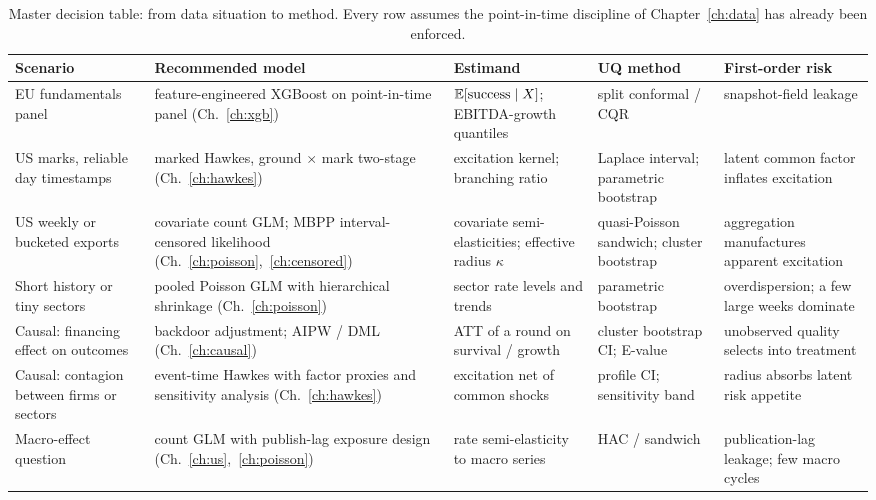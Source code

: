\begin{table}[htbp]
\centering
\footnotesize
\begin{tabular}{p{2.5cm}p{3.4cm}p{2.9cm}p{2.6cm}p{3.0cm}}
\toprule
Scenario & Recommended model & Estimand & UQ method & First-order risk \\
\midrule
EU fundamentals panel & feature-engineered XGBoost on point-in-time panel (Ch.~\ref{ch:xgb}) &
$\mathbb{E}[\text{success}\mid X]$; EBITDA-growth quantiles & split conformal / CQR & snapshot-field leakage \\
US marks, reliable day timestamps & marked Hawkes, ground $\times$ mark two-stage (Ch.~\ref{ch:hawkes}) &
excitation kernel; branching ratio & Laplace interval; parametric bootstrap & latent common factor
inflates excitation \\
US weekly or bucketed exports & covariate count GLM; MBPP interval-censored likelihood
(Ch.~\ref{ch:poisson},~\ref{ch:censored}) & covariate semi-elasticities; effective radius $\kappa$ &
quasi-Poisson sandwich; cluster bootstrap & aggregation manufactures apparent excitation \\
Short history or tiny sectors & pooled Poisson GLM with hierarchical shrinkage (Ch.~\ref{ch:poisson}) &
sector rate levels and trends & parametric bootstrap & overdispersion; a few large weeks dominate \\
Causal: financing effect on outcomes & backdoor adjustment; AIPW / DML (Ch.~\ref{ch:causal}) &
ATT of a round on survival / growth & cluster bootstrap CI; E-value & unobserved quality selects into
treatment \\
Causal: contagion between firms or sectors & event-time Hawkes with factor proxies and sensitivity
analysis (Ch.~\ref{ch:hawkes}) & excitation net of common shocks & profile CI; sensitivity band & radius
absorbs latent risk appetite \\
Macro-effect question & count GLM with publish-lag exposure design (Ch.~\ref{ch:us},~\ref{ch:poisson}) &
rate semi-elasticity to macro series & HAC / sandwich & publication-lag leakage; few macro cycles \\
\bottomrule
\end{tabular}
\caption{Master decision table: from data situation to method. Every row assumes the point-in-time
discipline of Chapter~\ref{ch:data} has already been enforced.}
\label{tab:sel-master}
\end{table}

